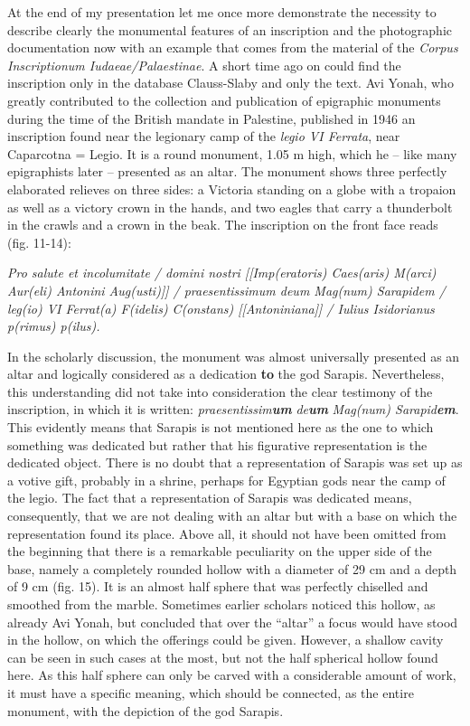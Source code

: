 \documentclass{article}
\begin{document}
At the end of my presentation let me once more demonstrate the necessity to describe 
clearly the monumental features of an inscription and the photographic documentation 
now with an example that comes from the material of the \textit{Corpus Inscriptionum 
Iudaeae/Palaestinae}. A short time ago on could find the inscription only in the 
database Clauss-Slaby and only the text. Avi Yonah, who greatly contributed to 
the collection and publication of epigraphic monuments during the time of the British 
mandate in Palestine, published in 1946 an inscription found near the legionary 
camp of the \textit{legio VI Ferrata}, near Caparcotna = Legio. It is a round monument, 
1.05 m high, which he – like many epigraphists later – presented as an altar. 
The monument shows three perfectly elaborated relieves on three sides: a Victoria 
standing on a globe with a tropaion as well as a victory crown in the hands, and 
two eagles that carry a thunderbolt in the crawls and a crown in the beak. The 
inscription on the front face reads (fig. 11-14):

\textit{Pro salute et incolumitate / domini nostri [[Imp(eratoris) Caes(aris) M(arci) 
Aur(eli) Antonini Aug(usti)]] / praesentissimum deum Mag(num) Sarapidem / leg(io) 
VI Ferrat(a) F(idelis) C(onstans) [[Antoniniana]] / Iulius Isidorianus p(rimus) 
p(ilus).}

In the scholarly discussion, the monument was almost universally presented as an 
altar and logically considered as a dedication \textbf{to} the god Sarapis.\textbf{ 
}Nevertheless, this understanding did not take into consideration the clear testimony 
of the inscription, in which it is written: \textit{praesentissim}\textit{\textbf{um}}\textit{ 
de}\textit{\textbf{um}}\textit{ Mag(num) Sarapid}\textit{\textbf{em}}. This evidently 
means that Sarapis is not mentioned here as the one to which something was dedicated 
but rather that his figurative representation is the dedicated object. There is 
no doubt that a representation of Sarapis was set up as a votive gift, probably 
in a shrine, perhaps for Egyptian gods near the camp of the legio. The fact that 
a representation of Sarapis was dedicated means, consequently, that we are not 
dealing with an altar but with a base on which the representation found its place. 
Above all, it should not have been omitted from the beginning that there is a remarkable 
peculiarity on the upper side of the base,\textbf{ }namely a completely rounded 
hollow with a diameter of 29 cm and a depth of 9 cm (fig. 15). It is an almost 
half sphere that was perfectly chiselled and smoothed from the marble. Sometimes 
earlier scholars noticed this hollow, as already Avi Yonah, but concluded that 
over the ``altar'' a focus would have stood in the hollow, on which the offerings 
could be given. However, a shallow cavity can be seen in such cases at the most, 
but not the half spherical hollow found here. As this half sphere can only be carved 
with a considerable amount of work, it must have a specific meaning, which should 
be connected, as the entire monument, with the depiction of the god Sarapis.   
 
\end{document}
